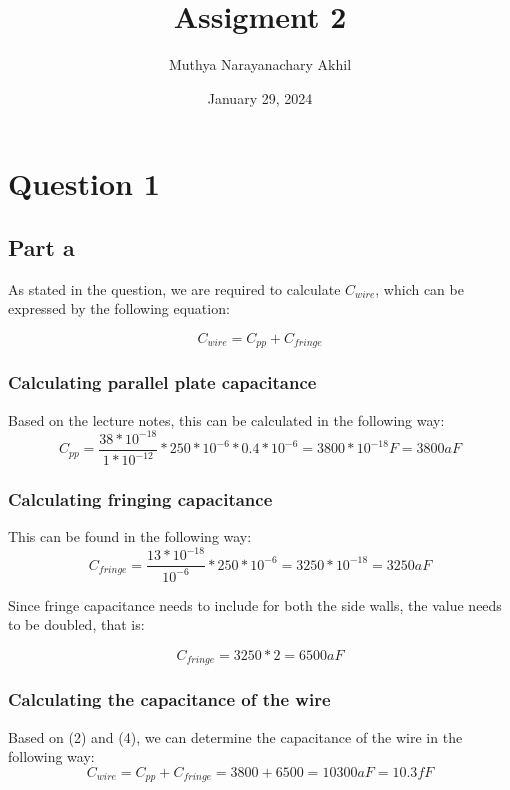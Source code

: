 \documentclass{article}
\title{Assigment 2}
\author{Muthya Narayanachary Akhil}
\date{January 29, 2024}
\begin{document}
\maketitle

\section*{Question 1}
\subsection*{Part a}
As stated in the question, we are required to calculate $C_{wire}$, which can be expressed by the following equation:

\begin{equation}
    C_{wire} = C_{pp} + C_{fringe}
\end{equation}

\subsubsection*{Calculating parallel plate capacitance}
Based on the lecture notes, this can be calculated in the following way:
\begin{equation}
    C_{pp} = \frac{38 * 10^{-18}}{1 * 10^{-12}} * 250 * 10^{-6} * 0.4 * 10^{-6} = 3800 * 10^{-18}F = 3800aF
\end{equation}

\subsubsection*{Calculating fringing capacitance}
This can be found in the following way:
\begin{equation}
    C_{fringe} = \frac{13 * 10^{-18}}{10^{-6}} * 250 * 10^{-6} = 3250 * 10^{-18} = 3250aF
\end{equation}

Since fringe capacitance needs to include for both the side walls, the value needs to be doubled, that is:

\begin{equation}
    C_{fringe} = 3250 * 2 = 6500aF
\end{equation}

\subsubsection*{Calculating the capacitance of the wire}
Based on (2) and (4), we can determine the capacitance of the wire in the following way:
\begin{equation}
    C_{wire} = C_{pp} + C_{fringe} = 3800 + 6500 = 10300aF = 10.3fF
\end{equation}
\end{document}
